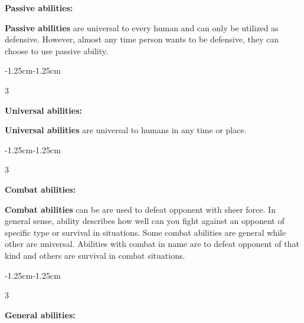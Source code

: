 \documentclass[a4paper, 12pt, finnish]{report}
\begin{document}
\newcommand{\nameSpacerG}[0]{\color{black}\Large{g}}
\newcommand{\nameSpacer}[0]{\makebox[0pt][l]{\nameSpacerG}}

\newcommand{\nameSize}[1]{\color{white}\small{ \textbf{#1}}}
\newcommand{\nameCommand}[1]{\nameSpacer\nameSize{#1}}

\newcommand{\emptyTable}[0]{
\begin{minipage}[b]{5cm}
\begin{center}
\begin{tabular}{ p{5cm} } 
 \
\end{tabular}
\end{center}
\end{minipage} \hfill
}

\newcommand{\cols}[1]{
\begin{adjustwidth}{-1.25cm}{-1.25cm}
\begin{multicols} {3}
#1
\end{multicols}
\end{adjustwidth}
}






\textbf{Passive abilities:}

\textbf{Passive abilities} are universal to every human and can only be utilized as defensive.
However, almost any time person wants to be defensive, they can choose to use passive ability.

\cols{
\PassiveAbility{}
}

\textbf{Universal abilities:}

\textbf{Universal abilities} are universal to humans in any time or place.

\cols{
\UniversalAbility{}
}

\pagebreak

\textbf{Combat abilities:}

\textbf{Combat abilities} can be are used to defeat opponent with sheer force. In general sense, ability describes how well can you fight against an opponent of specific type or survival in situations. Some combat abilities are general while other are universal. Abilities with combat in name are to defeat opponent of that kind and others are survival in combat situations.


\cols{
\CombatAbility{}
}

\pagebreak

\textbf{General abilities:}
\end{document}
